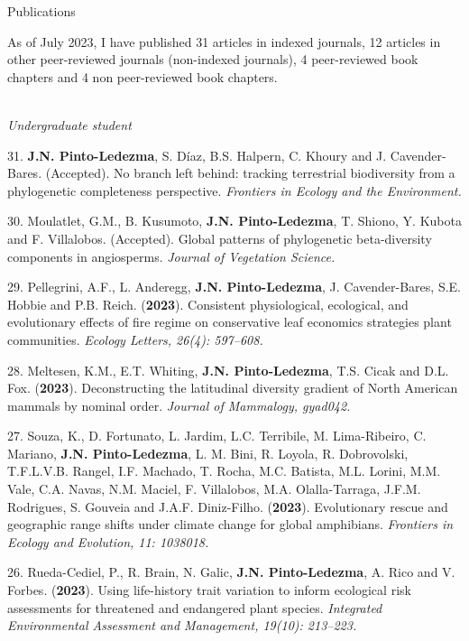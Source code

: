 \documentclass{resume} %
\begin{document}
\begin{rSection}{Publications}

\normalfont As of July 2023, I have published 31 articles in indexed journals, 12 articles in other peer-reviewed journals (non-indexed journals), 4 peer-reviewed book chapters and 4 non peer-reviewed book chapters.

 \\
{\em *Undergraduate student}

{31.} {\bf{J.N. Pinto-Ledezma}}, {S. Díaz, B.S. Halpern, C. Khoury and J. Cavender-Bares. (Accepted). No branch left behind: tracking terrestrial biodiversity from a phylogenetic completeness perspective.} {\em Frontiers in Ecology and the Environment.} 

{30.} {Moulatlet, G.M., B. Kusumoto,} {\bf{J.N. Pinto-Ledezma}}, { T. Shiono, Y. Kubota and F. Villalobos. (Accepted). Global patterns of phylogenetic beta-diversity components in angiosperms.} {\em Journal of Vegetation Science.}

{29.} {Pellegrini, A.F., L. Anderegg, } {\bf{J.N. Pinto-Ledezma}}, {J. Cavender-Bares, S.E. Hobbie and P.B. Reich. ({\bf{2023}}). Consistent physiological, ecological, and evolutionary effects of fire regime on conservative leaf economics strategies plant communities.} {\em Ecology Letters, 26(4): 597–608.}

{28.} {Meltesen, K.M., E.T. Whiting,} {\bf{J.N. Pinto-Ledezma}}, {T.S. Cicak and D.L. Fox. ({\bf{2023}}). Deconstructing the latitudinal diversity gradient of North American mammals by nominal order.} {\em Journal of Mammalogy, gyad042.}

{27.} {Souza, K., D. Fortunato, L. Jardim, L.C. Terribile, M. Lima-Ribeiro, C. Mariano,} {\bf{J.N. Pinto-Ledezma}}, {L. M. Bini, R. Loyola, R. Dobrovolski, T.F.L.V.B. Rangel, I.F. Machado, T. Rocha, M.C. Batista, M.L. Lorini, M.M. Vale, C.A. Navas, N.M. Maciel, F. Villalobos, M.A. Olalla-Tarraga, J.F.M. Rodrigues, S. Gouveia and J.A.F. Diniz-Filho. ({\bf{2023}}). Evolutionary rescue and geographic range shifts under climate change for global amphibians.} {\em Frontiers in Ecology and Evolution, 11: 1038018.}

{26.} {Rueda-Cediel, P., R. Brain, N. Galic, } {\bf{J.N. Pinto-Ledezma}}, {A. Rico and V. Forbes. ({\bf{2023}}). Using life-history trait variation to inform ecological risk assessments for threatened and endangered plant species.} {\em Integrated Environmental Assessment and Management, 19(10): 213–223.}


\end{rSection}
\end{document}
